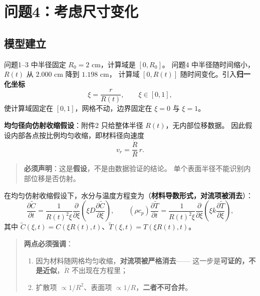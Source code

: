 \section{问题4：考虑尺寸变化}

\subsection{模型建立}

问题1--3 中半径固定 $R_0=2$ cm，计算域是 $[0,R_0]$。
问题4 中半径随时间缩小，$R(t)$ 从 $2.000$ cm 降到 $1.198$ cm，
计算域 $[0,R(t)]$ 随时间变化。引入\textbf{归一化坐标}
\begin{equation}
  \xi=\frac{r}{R(t)},\qquad \xi\in[0,1],
\end{equation}
使计算域固定在 $[0,1]$，网格不动，边界固定在 $\xi=0$ 与 $\xi=1$。

\textbf{均匀径向仿射收缩假设}：附件2 只给整体半径 $R(t)$，无内部位移数据。
因此假设内部各点按比例均匀收缩，即材料径向速度
\begin{equation}
  v_r=\frac{\dot R}{R}\,r .
\end{equation}

\begin{quote}
  \textbf{必须声明}：这是\textbf{假设}，不是由数据验证的结论。
  单个表面半径不能识别内部位移是否仿射。
\end{quote}

在均匀仿射收缩假设下，水分与温度方程变为（\textbf{材料导数形式，对流项被消去}）：
\begin{equation}
  \frac{\partial\widetilde C}{\partial t}
  =\frac{1}{R(t)^{2}\xi}\frac{\partial}{\partial\xi}
   \!\left(\xi D\frac{\partial\widetilde C}{\partial\xi}\right),
  \qquad
  \left(\rho c_p\right)\frac{\partial\widetilde T}{\partial t}
  =\frac{1}{R(t)^{2}\xi}\frac{\partial}{\partial\xi}
   \!\left(\xi k\frac{\partial\widetilde T}{\partial\xi}\right),
\end{equation}
其中 $\widetilde C(\xi,t)=C(\xi R(t),t)$、$\widetilde T(\xi,t)=T(\xi R(t),t)$。

\begin{quote}
  \textbf{两点必须强调}：
  \begin{enumerate}[leftmargin=1.6em, itemsep=2pt]
    \item 因为材料随网格均匀收缩，\textbf{对流项被严格消去}——
          这一步是\textbf{可证的，不是近似}，$\dot R$ 不出现在方程里；
    \item 扩散项 $\propto1/R^{2}$、表面项 $\propto1/R$，\textbf{二者不可合并}。
  \end{enumerate}
\end{quote}

